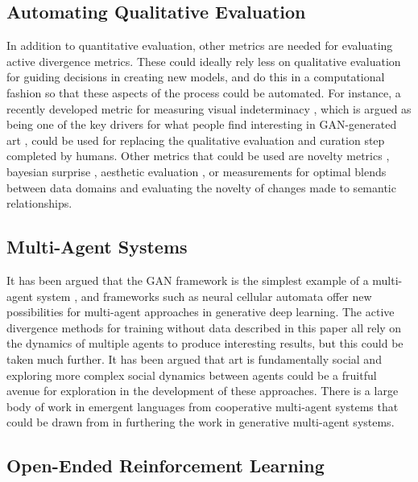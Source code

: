 \subsection{Automating Qualitative Evaluation}

In addition to quantitative evaluation, other metrics are needed for evaluating active divergence metrics. 
These could ideally rely less on qualitative evaluation for guiding decisions in creating new models, and do this in a computational fashion so that these aspects of the process could be automated.
For instance, a recently developed metric for measuring visual indeterminacy \citep{wang2020towards}, which is argued as being one of the key drivers for what people find interesting in GAN-generated art \citep{hertzmann2020visual}, could be used for replacing the qualitative evaluation and curation step completed by humans. 
Other metrics that could be used are novelty metrics \citep{grace2019expectation}, bayesian surprise \citep{itti2009bayesian}, aesthetic evaluation \citep{galanter2012computational}, or measurements for optimal blends between data domains and evaluating the novelty of changes made to semantic relationships.

\subsection{Multi-Agent Systems}

It has been argued that the GAN framework is the simplest example of a multi-agent system \citep{arcas2019social}, and frameworks such as neural cellular automata \citep{mordvintsev2020growing} offer new possibilities for multi-agent approaches in generative deep learning. 
The active divergence methods for training without data described in this paper all rely on the dynamics of multiple agents to produce interesting results, but this could be taken much further. 
It has been argued that art is fundamentally social \citep{hertzmann2021social} and exploring more complex social dynamics between agents \citep{saunders2019multi} could be a fruitful avenue for exploration in the development of these approaches. 
There is a large body of work in emergent languages from cooperative multi-agent systems \citep{lazaridou2016multi} that could be drawn from in furthering the work in generative multi-agent systems. 

\subsection{Open-Ended Reinforcement Learning}
\label{c6:subsec:open-ended}

